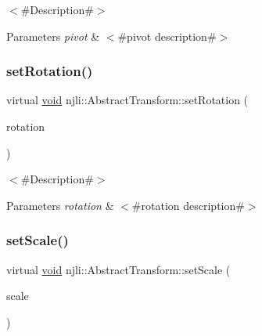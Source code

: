 $<$\#\+Description\#$>$


\begin{DoxyParams}{Parameters}
{\em pivot} & $<$\#pivot description\#$>$ \\
\hline
\end{DoxyParams}
\mbox{\label{classnjli_1_1_abstract_transform_a721ce04e176c7bdd5fea612ccbbd1e12}} 
\subsubsection{\texorpdfstring{set\+Rotation()}{setRotation()}}
{\footnotesize\ttfamily virtual \mbox{\hyperlink{_thread_8h_af1e856da2e658414cb2456cb6f7ebc66}{void}} njli\+::\+Abstract\+Transform\+::set\+Rotation (\begin{DoxyParamCaption}\item[{const bt\+Quaternion \&}]{rotation }\end{DoxyParamCaption})\hspace{0.3cm}{\ttfamily [virtual]}}

$<$\#\+Description\#$>$


\begin{DoxyParams}{Parameters}
{\em rotation} & $<$\#rotation description\#$>$ \\
\hline
\end{DoxyParams}
\mbox{\label{classnjli_1_1_abstract_transform_ab9059ed0b04b3e5af674ce2652ffda35}} 
\subsubsection{\texorpdfstring{set\+Scale()}{setScale()}\hspace{0.1cm}{\footnotesize\ttfamily [1/2]}}
{\footnotesize\ttfamily virtual \mbox{\hyperlink{_thread_8h_af1e856da2e658414cb2456cb6f7ebc66}{void}} njli\+::\+Abstract\+Transform\+::set\+Scale (\begin{DoxyParamCaption}\item[{const bt\+Vector3 \&}]{scale }\end{DoxyParamCaption})\hspace{0.3cm}{\ttfamily [virtual]}}

